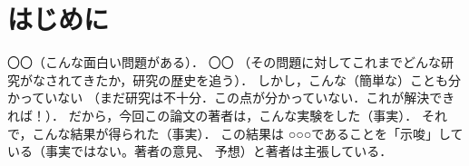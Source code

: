 ﻿\section{はじめに}

〇〇（こんな面白い問題がある）．
〇〇
（その問題に対してこれまでどんな研究がなされてきたか，研究の歴史を追う）．
しかし，こんな（簡単な）ことも分かっていない
（まだ研究は不十分．この点が分かっていない．これが解決できれば！）．
だから，今回この論文の著者は，こんな実験をした（事実）．
それで，こんな結果が得られた（事実）．
この結果は ○○○であることを「示唆」している（事実ではない。著者の意見、
予想）と著者は主張している．

